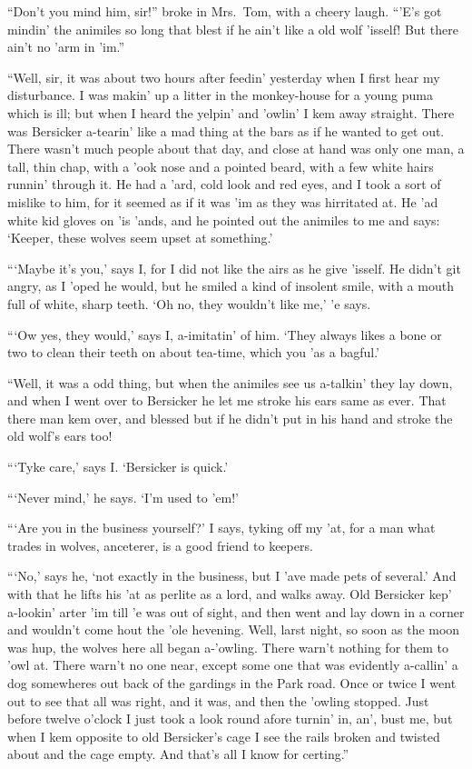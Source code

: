 \documentclass[12pt,openright]{book}
\begin{document}
“Don’t you mind him, sir!” broke in Mrs. Tom, with a cheery laugh. “’E’s got mindin’ the animiles so long that blest if he ain’t like a old wolf ’isself! But there ain’t no ’arm in ’im.”

“Well, sir, it was about two hours after feedin’ yesterday when I first hear my disturbance. I was makin’ up a litter in the monkey-house for a young puma which is ill; but when I heard the yelpin’ and ’owlin’ I kem away straight. There was Bersicker a-tearin’ like a mad thing at the bars as if he wanted to get out. There wasn’t much people about that day, and close at hand was only one man, a tall, thin chap, with a ’ook nose and a pointed beard, with a few white hairs runnin’ through it. He had a ’ard, cold look and red eyes, and I took a sort of mislike to him, for it seemed as if it was ’im as they was hirritated at. He ’ad white kid gloves on ’is ’ands, and he pointed out the animiles to me and says: ‘Keeper, these wolves seem upset at something.’

“‘Maybe it’s you,’ says I, for I did not like the airs as he give ’isself. He didn’t git angry, as I ’oped he would, but he smiled a kind of insolent smile, with a mouth full of white, sharp teeth. ‘Oh no, they wouldn’t like me,’ ’e says.

“‘Ow yes, they would,’ says I, a-imitatin’ of him. ‘They always likes a bone or two to clean their teeth on about tea-time, which you ’as a bagful.’

“Well, it was a odd thing, but when the animiles see us a-talkin’ they lay down, and when I went over to Bersicker he let me stroke his ears same as ever. That there man kem over, and blessed but if he didn’t put in his hand and stroke the old wolf’s ears too!

“‘Tyke care,’ says I. ‘Bersicker is quick.’

“‘Never mind,’ he says. ‘I’m used to ’em!’

“‘Are you in the business yourself?’ I says, tyking off my ’at, for a man what trades in wolves, anceterer, is a good friend to keepers.

“‘No,’ says he, ‘not exactly in the business, but I ’ave made pets of several.’ And with that he lifts his ’at as perlite as a lord, and walks away. Old Bersicker kep’ a-lookin’ arter ’im till ’e was out of sight, and then went and lay down in a corner and wouldn’t come hout the ’ole hevening. Well, larst night, so soon as the moon was hup, the wolves here all began a-’owling. There warn’t nothing for them to ’owl at. There warn’t no one near, except some one that was evidently a-callin’ a dog somewheres out back of the gardings in the Park road. Once or twice I went out to see that all was right, and it was, and then the ’owling stopped. Just before twelve o’clock I just took a look round afore turnin’ in, an’, bust me, but when I kem opposite to old Bersicker’s cage I see the rails broken and twisted about and the cage empty. And that’s all I know for certing.”
\end{document}
